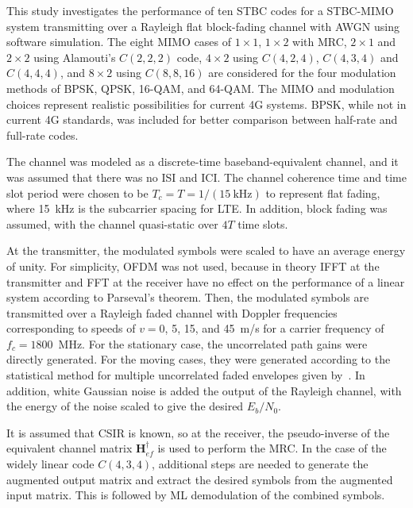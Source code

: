 

This study investigates the performance of ten STBC codes for a STBC-MIMO system transmitting over a Rayleigh flat block-fading channel with AWGN using software simulation. The eight MIMO cases of $1\times1$, $1\times2$ with MRC, $2\times1$ and $2\times2$ using Alamouti's $C(2,2,2)$ code, $4\times2$ using $C(4,2,4)$, $C(4,3,4)$ and $C(4,4,4)$, and $8\times2$ using $C(8,8,16)$ are considered for the four modulation methods of BPSK, QPSK, 16-QAM, and 64-QAM. The MIMO and modulation choices represent realistic possibilities for current 4G systems. BPSK, while not in current 4G standards, was included for better comparison between half-rate and full-rate codes.

The channel was modeled as a discrete-time baseband-equivalent channel, and it was assumed that there was no ISI and ICI. The channel coherence time and time slot period were chosen to be $T_c=T=1/(15~\text{kHz})$ to represent flat fading, where 15~kHz is the subcarrier spacing for LTE. In addition, block fading was assumed, with the channel quasi-static over $4T$ time slots.

At the transmitter, the modulated symbols were scaled to have an average energy of unity. For simplicity, OFDM was not used, because in theory IFFT at the transmitter and FFT at the receiver have no effect on the performance of a linear system according to Parseval's theorem. Then, the modulated symbols are transmitted over a Rayleigh faded channel with Doppler frequencies corresponding to speeds of $v={}$0, 5, 15, and 45~m/s for a carrier frequency of $f_c=1800$~MHz. For the stationary case, the uncorrelated path gains were directly generated. For the moving cases, they were generated according to the statistical method for multiple uncorrelated faded envelopes given by~\cite{stuber12}. In addition, white Gaussian noise is added the output of the Rayleigh channel, with the energy of the noise scaled to give the desired $E_b/N_0$.

It is assumed that CSIR is known, so at the receiver, the pseudo-inverse of the equivalent channel matrix $\bm{H}_{ef}^\dagger$ is used to perform the MRC. In the case of the widely linear code $C(4,3,4)$, additional steps are needed to generate the augmented output matrix and extract the desired symbols from the augmented input matrix. This is followed by ML demodulation of the combined symbols.

